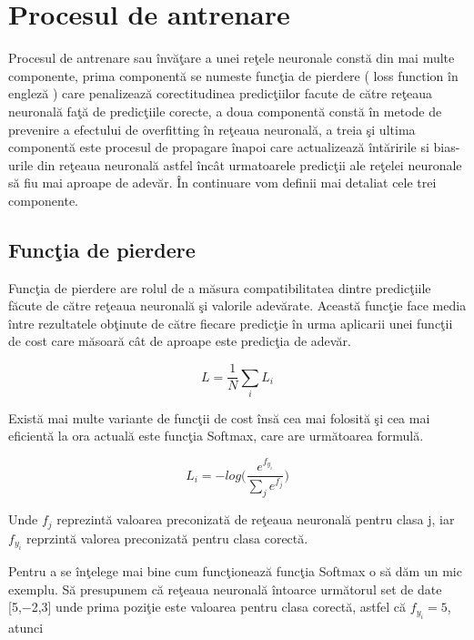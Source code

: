 \section{Procesul de antrenare}

Procesul de antrenare sau \^{i}nv\u{a}\c{t}are a unei re\c{t}ele neuronale const\u{a} din mai multe componente, prima component\u{a} se numeste func\c{t}ia de pierdere ( loss function \^{i}n englez\u{a} ) care penalizeaz\u{a} corectitudinea predic\c{t}iilor facute de c\u{a}tre re\c{t}eaua neuronal\u{a} fa\c{t}\u{a} de predic\c{t}iile corecte, a doua component\u{a} const\u{a} \^{i}n metode de prevenire a efectului de overfitting \^{i}n re\c{t}eaua neuronal\u{a}, a treia \c{s}i ultima component\u{a} este procesul de propagare \^{i}napoi care actualizeaz\u{a} \^{i}nt\u{a}ririle si bias-urile din re\c{t}eaua neuronal\u{a} astfel \^{i}nc\^{a}t urmatoarele predic\c{t}ii ale re\c{t}elei neuronale s\u{a} fiu mai aproape de adev\u{a}r. \^{I}n continuare vom definii mai detaliat cele trei componente.

\subsection{Func\c{t}ia de pierdere}

Func\c{t}ia de pierdere are rolul de a m\u{a}sura compatibilitatea dintre predic\c{t}iile f\u{a}cute de c\u{a}tre re\c{t}eaua neuronal\u{a} \c{s}i valorile adev\u{a}rate. Aceast\u{a} func\c{t}ie face media \^{i}ntre rezultatele ob\c{t}inute de c\u{a}tre fiecare predic\c{t}ie \^{i}n urma aplicarii unei func\c{t}ii de cost care m\u{a}soar\u{a} c\^{a}t de aproape este predic\c{t}ia de adev\u{a}r.

$$L = \frac{1}{N} \sum_i L_i $$

Exist\u{a} mai multe variante de func\c{t}ii de cost \^{i}ns\u{a} cea mai folosit\u{a} \c{s}i cea mai eficient\u{a} la ora actual\u{a} este func\c{t}ia Softmax, care are urm\u{a}toarea formul\u{a}.

$$ L_i = - log \bigg(\frac{e^{f_y_i}}{\sum_j e^{f_j}}\bigg)$$

Unde $f_j$ reprezint\u{a} valoarea preconizat\u{a} de re\c{t}eaua neuronal\u{a} pentru clasa j, iar $f_y_i$ reprzint\u{a} valorea preconizat\u{a} pentru clasa corect\u{a}.

\par

Pentru a se \^{i}n\c{t}elege mai bine cum func\c{t}ioneaz\u{a} func\c{t}ia Softmax o s\u{a} d\u{a}m un mic exemplu. S\u{a} presupunem c\u{a} re\c{t}eaua neuronal\u{a} \^{i}ntoarce urm\u{a}torul set de date [5,−2,3] unde prima pozi\c{t}ie este valoarea pentru clasa corect\u{a}, astfel c\u{a} $f_y_i = 5$, atunci 

